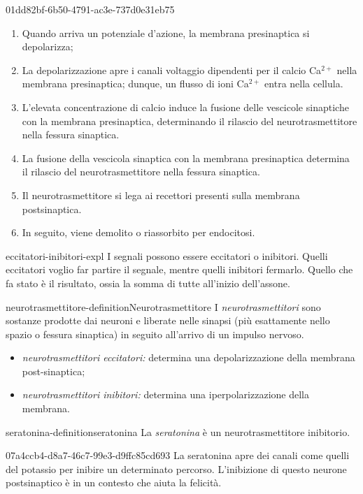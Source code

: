 \documentclass[preview]{standalone}
\begin{document}
\begin{snippet}{01dd82bf-6b50-4791-ac3e-737d0e31eb75}
    \begin{enumerate}
        \item Quando arriva un potenziale d'azione, la membrana presinaptica si depolarizza;
        \item La depolarizzazione apre i canali voltaggio dipendenti per il calcio Ca\({}^{2+}\) nella membrana
            presinaptica; dunque, un flusso di ioni Ca\({}^{2+}\) entra nella cellula.
        \item L'elevata concentrazione di calcio induce la fusione delle vescicole sinaptiche con la
            membrana presinaptica, determinando il rilascio del neurotrasmettitore nella fessura
            sinaptica.
        \item La fusione della vescicola sinaptica con la membrana presinaptica determina il rilascio del
        neurotrasmettitore nella fessura sinaptica.
        \item Il neurotrasmettitore si lega ai recettori presenti sulla membrana postsinaptica.
        \item In seguito, viene demolito o riassorbito per endocitosi.
    \end{enumerate}
\end{snippet}

\begin{snippet}{eccitatori-inibitori-expl}
    I segnali possono essere eccitatori o inibitori.
Quelli eccitatori voglio far partire il segnale, mentre quelli inibitori
fermarlo. Quello che fa stato è il risultato, ossia la somma di tutte
all'inizio dell'assone.
\end{snippet}

\begin{snippetdefinition}{neurotrasmettitore-definition}{Neurotrasmettitore}
    I \textit{neurotrasmettitori} sono sostanze prodotte dai neuroni e liberate nelle sinapsi (più
    esattamente nello spazio o fessura sinaptica) in seguito all'arrivo di un impulso nervoso.
    \begin{itemize}
        \item \textit{neurotrasmettitori eccitatori:} determina una depolarizzazione della membrana post-sinaptica;
        \item \textit{neurotrasmettitori inibitori:} determina una iperpolarizzazione della membrana.
    \end{itemize}
\end{snippetdefinition}

\begin{snippetdefinition}{seratonina-definition}{seratonina}
    La \textit{seratonina} è un neurotrasmettitore inibitorio.
\end{snippetdefinition}

\begin{snippet}{07a4ccb4-d8a7-46c7-99e3-d9ffc85cd693}
    La seratonina apre dei canali come quelli del potassio per inibire un determinato percorso.
L'inibizione di questo neurone postsinaptico è in un contesto che aiuta la felicità.
\end{snippet}
\end{document}

